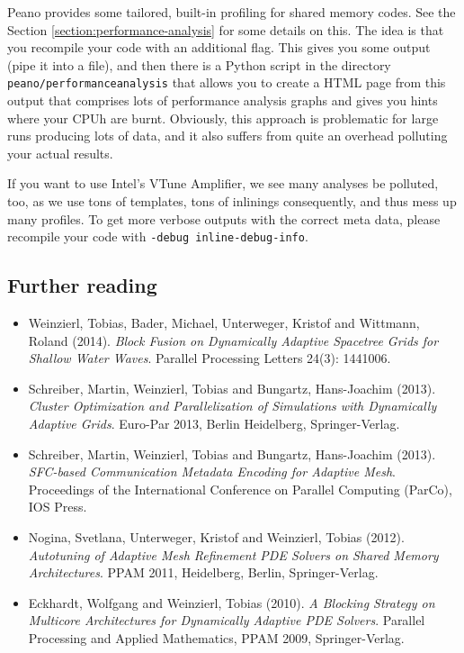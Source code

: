 Peano provides some tailored, built-in profiling for shared memory codes. 
See the Section \ref{section:performance-analysis} for some details on this. 
The idea is that you recompile your code with an additional flag.
This gives you some output (pipe it into a file), and then there is a Python
script in the directory \texttt{peano/performanceanalysis} that allows you to
create a HTML page from this output that comprises lots of performance analysis
graphs and gives you hints where your CPUh are burnt. Obviously, this approach
is problematic for large runs producing lots of data, and it also suffers from
quite an overhead polluting your actual results.

If you want to use Intel's VTune Amplifier, we see many analyses be polluted,
too, as we use tons of templates, tons of inlinings consequently, and thus mess
up many profiles. To get more verbose outputs with the correct meta data, please
recompile your code with \texttt{-debug inline-debug-info}.


\subsection*{Further reading}

\begin{itemize}
  \item Weinzierl, Tobias, Bader, Michael, Unterweger, Kristof and Wittmann,
  Roland (2014). {\em Block Fusion on Dynamically Adaptive Spacetree Grids for
  Shallow Water Waves}. Parallel Processing Letters 24(3): 1441006.
  \item Schreiber, Martin, Weinzierl, Tobias and Bungartz, Hans-Joachim (2013).
  {\em Cluster Optimization and Parallelization of Simulations with Dynamically
  Adaptive Grids}. Euro-Par 2013, Berlin Heidelberg, Springer-Verlag.
  \item Schreiber, Martin, Weinzierl, Tobias and Bungartz, Hans-Joachim (2013).
  {\em SFC-based Communication Metadata Encoding for Adaptive Mesh}. Proceedings
  of the International Conference on Parallel Computing (ParCo), IOS Press.
  \item Nogina, Svetlana, Unterweger, Kristof and Weinzierl, Tobias (2012).
  {\em Autotuning of Adaptive Mesh Refinement PDE Solvers on Shared Memory
  Architectures}. PPAM 2011, Heidelberg, Berlin, Springer-Verlag.
  \item Eckhardt, Wolfgang and Weinzierl, Tobias (2010). {\em A Blocking
  Strategy on Multicore Architectures for Dynamically Adaptive PDE Solvers}.
  Parallel Processing and Applied Mathematics, PPAM 2009, Springer-Verlag.
\end{itemize}
